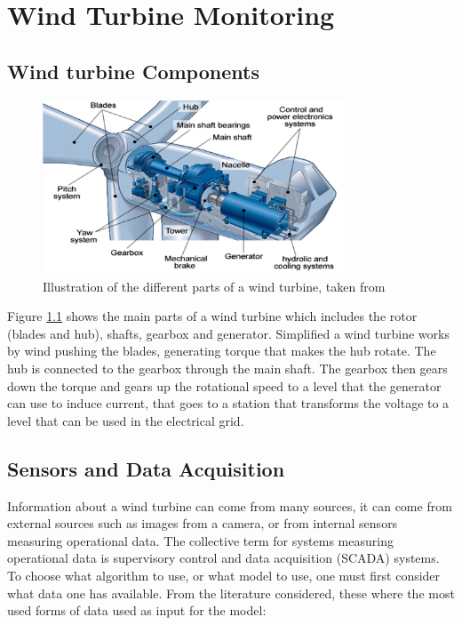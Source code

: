 \chapter{Wind Turbine Monitoring} \label{s:wt_monitoring}

\section{Wind turbine Components}
\begin{figure}[h]
    \begin{center}
    \includegraphics[width=0.8\textwidth]{wind_turbine/wt_parts.png}
    \end{center}
    \caption{Illustration of the different parts of a wind turbine, taken from \textcite{adv_meth_for_wt_cond_monit_rev}}
    \label{fig:wt_parts}
\end{figure}

Figure \ref{fig:wt_parts} shows the main parts of a wind turbine which includes the rotor (blades and hub), shafts, gearbox and generator. 
Simplified a wind turbine works by wind pushing the blades, generating torque that makes the hub rotate. 
The hub is connected to the gearbox through the main shaft. 
The gearbox then gears down the torque and gears up the rotational speed to a level that the generator can use to induce current, that goes to a station that transforms the voltage to a level that can be used in the electrical grid. 

\section{Sensors and Data Acquisition}

Information about a wind turbine can come from many sources, it can come from external sources such as images from a camera, or from internal sensors measuring operational data. 
The collective term for systems measuring operational data is supervisory control and data acquisition (SCADA) systems. 
To choose what algorithm to use, or what model to use, one must first consider what data one has available. 
From the literature considered, these where the most used forms of data used as input for the model:

